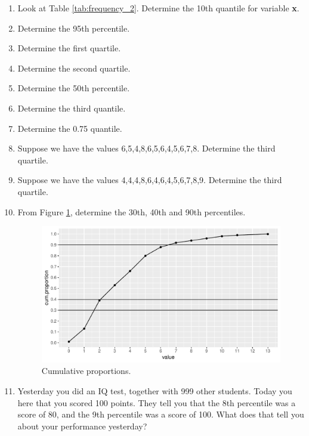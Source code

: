 \documentclass[]{report}\usepackage[]{graphicx}\usepackage[]{color}
\makeatletter
\def\maxwidth{ %
  \ifdim\Gin@nat@width>\linewidth
    \linewidth
  \else
    \Gin@nat@width
  \fi
}
\makeatother
\begin{document}
\begin{enumerate}
\item Look at Table \ref{tab:frequency_2}. Determine the 10th quantile for variable \textbf{x}. 

\item Determine the 95th percentile. 

\item Determine the first quartile. 

\item Determine the second quartile.

\item Determine the 50th percentile.

\item Determine the third quantile.

\item Determine the 0.75 quantile.

\item Suppose we have the values {6,5,4,8,6,5,6,4,5,6,7,8}. Determine the third quartile.

\item Suppose we have the values {4,4,4,8,6,4,6,4,5,6,7,8,9}. Determine the third quartile.

\item From Figure \ref{fig:quartile_3}, determine the 30th, 40th and 90th percentiles.

\begin{figure}

{\centering \includegraphics[width=\maxwidth]{figure/quartile_3-1} 

}

\caption[Cumulative proportions]{Cumulative proportions.}\label{fig:quartile_3}
\end{figure}



\item Yesterday you did an IQ test, together with 999 other students. Today you here that you scored 100 points. They tell you that the 8th percentile was a score of 80, and the 9th percentile was a score of 100. What does that tell you about your performance yesterday?


\end{enumerate}
\end{document}
